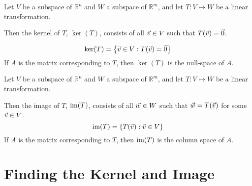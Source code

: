 \documentclass[pdf
]{beamer}
\begin{document}
{{	\begin{definition}[Kernel]
		Let $V$ be a subspace of $\mathbb{R}^n$ and $W$ a subspace of $\mathbb{R}^m$, and
		let $T: V \mapsto W$ be a linear transformation. 
		\pause
		
		Then the \alert{kernel} of $T$, $\ker(T)$, consists of all $\vec{v} \in V$ such that $T(\vec{v}) = \vec{0}$. 
		
		\pause
		
		\[
		\ker(T) = \left\{ \vec{v} \in V : T(\vec{v}) = \vec{0} \right\}
		\]
		If $ A $ is the matrix corresponding to $ T $, then $ \ker(T) $ is the null-space of $ A $.
	\end{definition}
	
	\medskip
	\pause
	
	\begin{definition}[Image]
		Let $V$ be a subspace of $\mathbb{R}^n$ and $W$ a subspace of $\mathbb{R}^m$, and
		let $T: V \mapsto W$ be a linear transformation. 
		\pause
		
		Then the \alert{image} of $T$, $\mbox{im}(T)$, consists of all $\vec{w} \in W$ such that $\vec{w} = T(\vec{v})$ for some $\vec{v} \in V$. 
				\pause
		\[
		\mbox{im}(T) = \left\{ T(\vec{v}) : \vec{v} \in V \right\}
		\]
	If $ A $ is the matrix corresponding to $ T $, then $ \mbox{im}(T) $ is the column space of $ A $.	
	\end{definition}
	
}}

%	
%		
%		
%	

\section{Finding the Kernel and Image}
\end{document}
